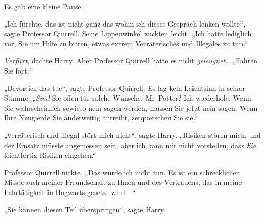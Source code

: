 Es gab eine kleine Pause.

„Ich fürchte, das ist nicht ganz das wohin ich dieses Gespräch lenken wollte“, sagte Professor Quirrell. Seine Lippenwinkel zuckten leicht. „Ich hatte lediglich vor, Sie um Hilfe zu bitten, etwas extrem Verräterisches und Illegales zu tun.“

\emph{Verflixt}, dachte Harry. Aber Professor Quirrell hatte es nicht \emph{geleugnet}… „Fahren Sie fort.“

„Bevor ich das tue“, sagte Professor Quirrell. Es lag kein Leichtsinn in seiner Stimme. „\emph{Sind} Sie offen für solche Wünsche, Mr~Potter? Ich wiederhole: Wenn Sie wahrscheinlich sowieso nein sagen werden, müssen Sie jetzt nein sagen. Wenn Ihre Neugierde Sie anderweitig antreibt, zerquetschen Sie sie.“

„Verräterisch und illegal stört mich nicht“, sagte Harry. „Risiken stören mich, und der Einsatz müsste angemessen sein, aber ich kann mir nicht vorstellen, dass \emph{Sie} leichtfertig Risiken eingehen.“

Professor Quirrell nickte. „Das würde ich nicht tun. Es ist ein schrecklicher Missbrauch meiner Freundschaft zu Ihnen und des Vertrauens, das in meine Lehrtätigkeit in Hogwarts gesetzt wird—“

„Sie können diesen Teil überspringen“, sagte Harry.

